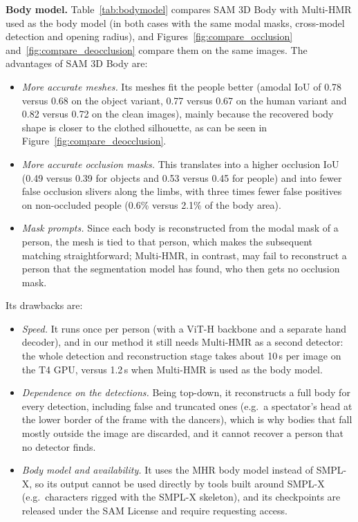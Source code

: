 \documentclass[pdflatex,sn-mathphys-num]{sn-jnl}%
\begin{document}
\textbf{Body model.} Table~\ref{tab:bodymodel} compares SAM 3D Body with Multi-HMR used as the body model (in both cases with the same modal masks, cross-model detection and opening radius), and Figures~\ref{fig:compare_occlusion} and~\ref{fig:compare_deocclusion} compare them on the same images. The advantages of SAM 3D Body are:
\begin{itemize}
  \item \emph{More accurate meshes.} Its meshes fit the people better (amodal IoU of 0.78 versus 0.68 on the object variant, 0.77 versus 0.67 on the human variant and 0.82 versus 0.72 on the clean images), mainly because the recovered body shape is closer to the clothed silhouette, as can be seen in Figure~\ref{fig:compare_deocclusion}.
  \item \emph{More accurate occlusion masks.} This translates into a higher occlusion IoU (0.49 versus 0.39 for objects and 0.53 versus 0.45 for people) and into fewer false occlusion slivers along the limbs, with three times fewer false positives on non-occluded people (0.6\% versus 2.1\% of the body area).
  \item \emph{Mask prompts.} Since each body is reconstructed from the modal mask of a person, the mesh is tied to that person, which makes the subsequent matching straightforward; Multi-HMR, in contrast, may fail to reconstruct a person that the segmentation model has found, who then gets no occlusion mask.
\end{itemize}
Its drawbacks are:
\begin{itemize}
  \item \emph{Speed.} It runs once per person (with a ViT-H backbone and a separate hand decoder), and in our method it still needs Multi-HMR as a second detector: the whole detection and reconstruction stage takes about 10\,s per image on the T4 GPU, versus 1.2\,s when Multi-HMR is used as the body model.
  \item \emph{Dependence on the detections.} Being top-down, it reconstructs a full body for every detection, including false and truncated ones (e.g.\ a spectator's head at the lower border of the frame with the dancers), which is why bodies that fall mostly outside the image are discarded, and it cannot recover a person that no detector finds.
  \item \emph{Body model and availability.} It uses the MHR body model instead of SMPL-X, so its output cannot be used directly by tools built around SMPL-X (e.g.\ characters rigged with the SMPL-X skeleton), and its checkpoints are released under the SAM License and require requesting access.
\end{itemize}
\end{document}
